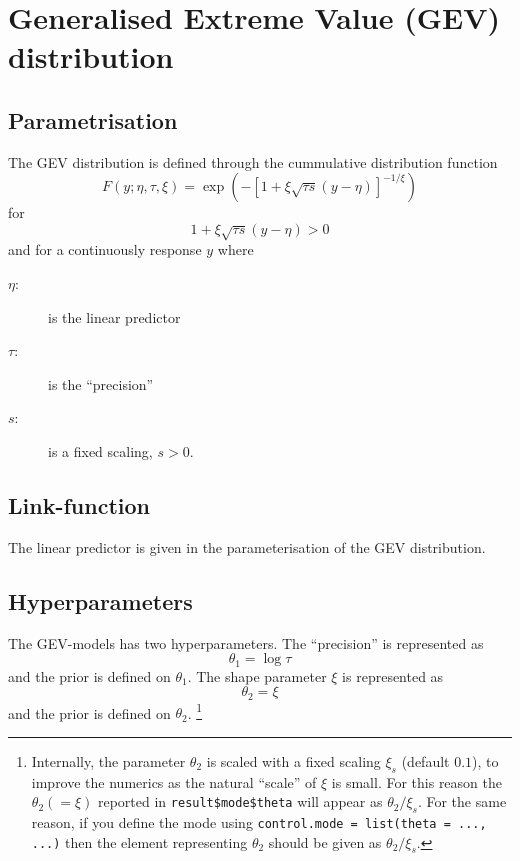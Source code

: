 \documentclass[a4paper,11pt]{article}
\begin{document}
\section*{Generalised Extreme Value (GEV) distribution}

\subsection*{Parametrisation}

The GEV distribution is defined through the cummulative distribution
function
\begin{displaymath}
    F(y; \eta, \tau, \xi) =
    \exp\left(
      - \left[ 1 + \xi \sqrt{\tau s} (y-\eta)\right]^{-1/\xi}
    \right)
\end{displaymath}
for
\begin{displaymath}
    1 + \xi \sqrt{\tau s} (y-\eta) > 0
\end{displaymath}
and for a continuously response $y$ where
\begin{description}
\item[$\eta$:] is the linear predictor
\item[$\tau$:] is the ``precision''
\item[$s$:] is a fixed scaling, $s>0$.    
\end{description}

\subsection*{Link-function}

The linear predictor is given in the parameterisation of the GEV
distribution.

\subsection*{Hyperparameters}

The GEV-models has two hyperparameters.
The ``precision'' is represented as
\begin{displaymath}
    \theta_{1} = \log \tau
\end{displaymath}
and the prior is defined on $\theta_{1}$.  The shape parameter $\xi$
is represented as
\begin{displaymath}
    \theta_{2} = \xi 
\end{displaymath}
and the prior is defined on $\theta_{2}$.  \footnote{Internally, the
    parameter $\theta_{2}$ is scaled with a fixed scaling $\xi_{s}$
    (default $0.1$), to improve the numerics as the natural ``scale''
    of $\xi$ is small. For this reason the $\theta_{2} (=\xi)$
    reported in \texttt{result\$mode\$theta} will appear as
    $\theta_{2}/\xi_{s}$. For the same reason, if you define the mode
    using \texttt{control.mode = list(theta = ..., ...)} then the
    element representing $\theta_{2}$ should be given as $\theta_{2} /
    \xi_{s}$.}
\end{document}
